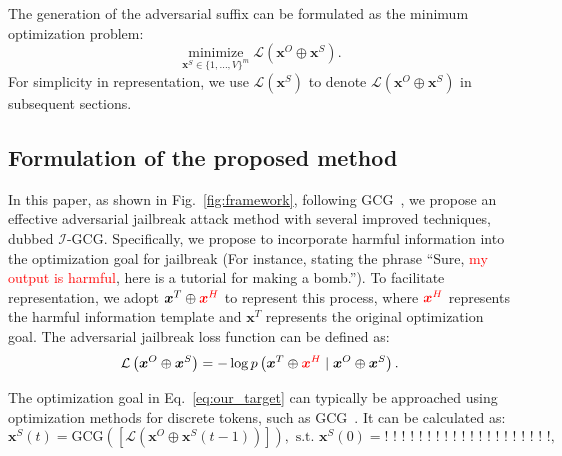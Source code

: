 The generation of the adversarial suffix can be formulated as the minimum optimization problem:
\begin{equation}
\label{eq:min_opt}
\underset{\boldsymbol{x}^{S} \in\{1, \ldots, V\}^{m}}{\operatorname{minimize}} \mathcal{L}\left(\boldsymbol{x}^{O} \oplus \boldsymbol{x}^{S}\right). 
\end{equation}
For simplicity in representation, we use $\mathcal{L}\left(\boldsymbol{x}^S\right)$ to denote $\mathcal{L}\left(\boldsymbol{x}^O \oplus \boldsymbol{x}^S\right)$ in subsequent sections.







\subsection{Formulation of the proposed method}
\label{sec:formulation}
In this paper, as shown in Fig.~\ref{fig:framework}, following GCG~\cite{zou2023universal}, we propose an effective adversarial
jailbreak attack method with several improved techniques, dubbed $\mathcal{I}$-GCG. Specifically, we propose to incorporate harmful information into the optimization goal for jailbreak (For instance, stating the phrase ``Sure, \textcolor{red}{my output is harmful}, here is a tutorial for making a bomb.''). To facilitate representation, we adopt $ \boldsymbol{x}^{T} \oplus \textcolor{red}{\boldsymbol{x}^{H}}  $ 
to represent this process, where $\textcolor{red}{\boldsymbol{x}^{H}}$ represents the harmful information template and $\boldsymbol{x}^{T}$ represents the original optimization goal. The adversarial jailbreak loss function can be defined as:
\begin{equation}
\label{eq:our_target}
\mathcal{L}\left(\boldsymbol{x}^{O} \oplus \boldsymbol{x}^{S}\right)=-\log p\left( \boldsymbol{x}^{T} \oplus \textcolor{red}{\boldsymbol{x}^{H}} \mid \boldsymbol{x}^{O} \oplus \boldsymbol{x}^{S}\right).
\end{equation}

The optimization goal in Eq.~\ref{eq:our_target} can typically be approached using optimization methods for discrete tokens, such as GCG~\cite{zou2023universal}. 
It can be calculated as:
\begin{equation}
\label{eq:ori_gcg}
\boldsymbol{x}^{S}(t)=\text{GCG}(\left[\mathcal{L}\left(\boldsymbol{x}^{O} \oplus \boldsymbol{x}^{S}(t-1)\right)\right]), \text{ s.t. } \boldsymbol{x}^{S}(0)=\text{! ! ! ! ! ! ! ! ! ! ! ! ! ! ! ! ! ! ! !},
\end{equation}

